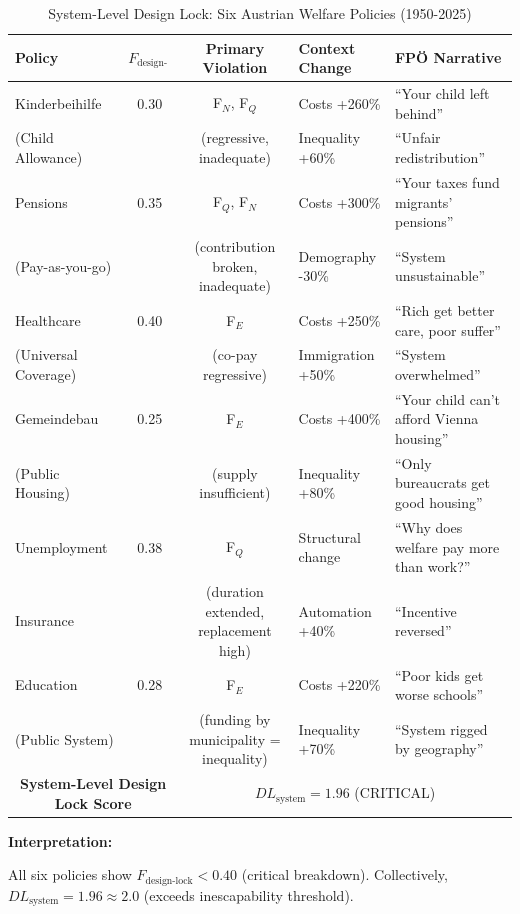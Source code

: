 \begin{table}[htbp]
\centering
\caption{System-Level Design Lock: Six Austrian Welfare Policies (1950-2025)}
\label{tab:cm-systemlock-6policies}
\renewcommand{\arraystretch}{1.4}
\begin{tabular}{@{}lccll@{}}
\toprule
\textbf{Policy} & $F_{\text{design-lock}}$ & \textbf{Primary Violation} & \textbf{Context Change} & \textbf{FPÖ Narrative} \\
\midrule
Kinderbeihilfe & 0.30 & F$_N$, F$_Q$ & Costs +260\% & ``Your child left behind'' \\
(Child Allowance) & & (regressive, inadequate) & Inequality +60\% & ``Unfair redistribution'' \\
\midrule
Pensions & 0.35 & F$_Q$, F$_N$ & Costs +300\% & ``Your taxes fund migrants' pensions'' \\
(Pay-as-you-go) & & (contribution broken, inadequate) & Demography -30\% & ``System unsustainable'' \\
\midrule
Healthcare & 0.40 & F$_E$ & Costs +250\% & ``Rich get better care, poor suffer'' \\
(Universal Coverage) & & (co-pay regressive) & Immigration +50\% & ``System overwhelmed'' \\
\midrule
Gemeindebau & 0.25 & F$_E$ & Costs +400\% & ``Your child can't afford Vienna housing'' \\
(Public Housing) & & (supply insufficient) & Inequality +80\% & ``Only bureaucrats get good housing'' \\
\midrule
Unemployment & 0.38 & F$_Q$ & Structural change & ``Why does welfare pay more than work?'' \\
Insurance & & (duration extended, replacement high) & Automation +40\% & ``Incentive reversed'' \\
\midrule
Education & 0.28 & F$_E$ & Costs +220\% & ``Poor kids get worse schools'' \\
(Public System) & & (funding by municipality = inequality) & Inequality +70\% & ``System rigged by geography'' \\
\midrule
\multicolumn{2}{c}{\textbf{System-Level Design Lock Score}} & \multicolumn{3}{c}{$DL_{\text{system}} = 1.96$ (CRITICAL)} \\
\bottomrule
\end{tabular}
\end{table}

\textbf{Interpretation:}

All six policies show $F_{\text{design-lock}} < 0.40$ (critical breakdown). Collectively, $DL_{\text{system}} = 1.96 \approx 2.0$
(exceeds inescapability threshold).

